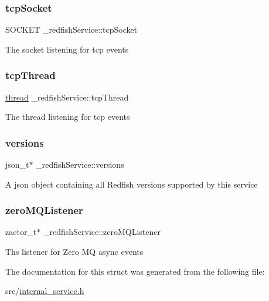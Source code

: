 \subsubsection{\texorpdfstring{tcp\+Socket}{tcpSocket}}
{\footnotesize\ttfamily S\+O\+C\+K\+ET \+\_\+redfish\+Service\+::tcp\+Socket}

The socket listening for tcp events \mbox{\label{struct__redfishService_a996d74c5be8aec0056150bf04a67ad19}} 
\subsubsection{\texorpdfstring{tcp\+Thread}{tcpThread}}
{\footnotesize\ttfamily \hyperlink{queue_8h_a1ab4f928aeccce6e6996ee96a4059c8a}{thread} \+\_\+redfish\+Service\+::tcp\+Thread}

The thread listening for tcp events \mbox{\label{struct__redfishService_a380d0b9d53d04b26fe44f6abc703eb85}} 
\subsubsection{\texorpdfstring{versions}{versions}}
{\footnotesize\ttfamily json\+\_\+t$\ast$ \+\_\+redfish\+Service\+::versions}

A json object containing all Redfish versions supported by this service \mbox{\label{struct__redfishService_a63dfd6f2784aad814ba5c34c1a2dac01}} 
\subsubsection{\texorpdfstring{zero\+M\+Q\+Listener}{zeroMQListener}}
{\footnotesize\ttfamily zactor\+\_\+t$\ast$ \+\_\+redfish\+Service\+::zero\+M\+Q\+Listener}

Ths listener for Zero MQ async events 

The documentation for this struct was generated from the following file\+:\begin{DoxyCompactItemize}
\item 
src/\hyperlink{internal__service_8h}{internal\+\_\+service.\+h}\end{DoxyCompactItemize}
